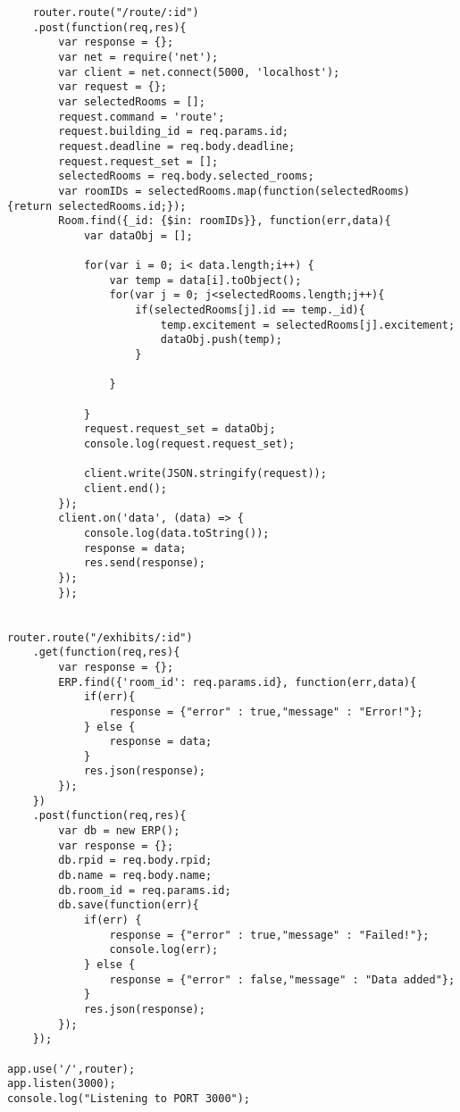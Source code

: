 \begin{lstlisting}
    router.route("/route/:id")
    .post(function(req,res){
        var response = {};
        var net = require('net');
        var client = net.connect(5000, 'localhost');
        var request = {};
        var selectedRooms = [];
        request.command = 'route';
        request.building_id = req.params.id;
        request.deadline = req.body.deadline;
        request.request_set = [];
        selectedRooms = req.body.selected_rooms;
        var roomIDs = selectedRooms.map(function(selectedRooms) {return selectedRooms.id;});
        Room.find({_id: {$in: roomIDs}}, function(err,data){
            var dataObj = [];
            
            for(var i = 0; i< data.length;i++) {
                var temp = data[i].toObject();
                for(var j = 0; j<selectedRooms.length;j++){
                    if(selectedRooms[j].id == temp._id){
                        temp.excitement = selectedRooms[j].excitement;
                        dataObj.push(temp);    
                    }
                        
                }
               
            }
            request.request_set = dataObj;
            console.log(request.request_set); 

            client.write(JSON.stringify(request));
            client.end();
        });
        client.on('data', (data) => {
            console.log(data.toString());
            response = data;
            res.send(response);
        });
        });
    

router.route("/exhibits/:id")
    .get(function(req,res){
        var response = {};
        ERP.find({'room_id': req.params.id}, function(err,data){
            if(err){
                response = {"error" : true,"message" : "Error!"};
            } else {
                response = data;
            }
            res.json(response);
        });
    })
    .post(function(req,res){
        var db = new ERP();
        var response = {};
        db.rpid = req.body.rpid; 
        db.name = req.body.name;
        db.room_id = req.params.id; 
        db.save(function(err){
            if(err) {
                response = {"error" : true,"message" : "Failed!"};
                console.log(err);
            } else {
                response = {"error" : false,"message" : "Data added"};
            }
            res.json(response);
        });
    });

app.use('/',router);
app.listen(3000);
console.log("Listening to PORT 3000");
\end{lstlisting}
\newpage
